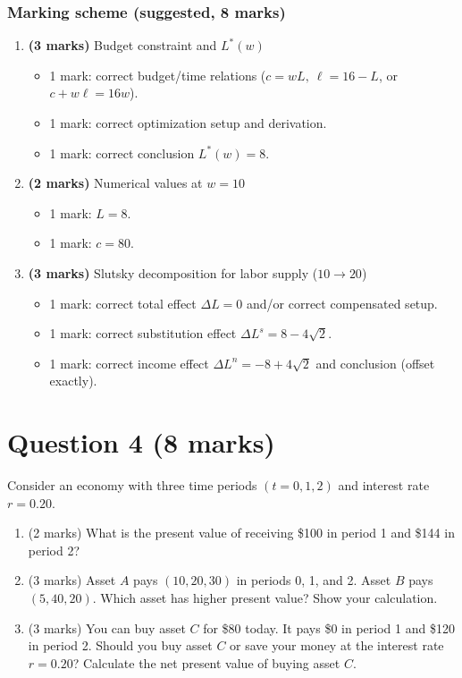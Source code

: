 \documentclass[12pt]{article}
\begin{document}
\newpage
\subsubsection*{Marking scheme (suggested, 8 marks)}

\begin{enumerate}[label=(\alph*)]
\item \textbf{(3 marks)} Budget constraint and \(L^*(w)\)
\begin{itemize}
\item 1 mark: correct budget/time relations (\(c=wL,\ \ell=16-L\), or \(c+w\ell=16w\)).
\item 1 mark: correct optimization setup and derivation.
\item 1 mark: correct conclusion \(\boxed{L^*(w)=8}\).
\end{itemize}

\item \textbf{(2 marks)} Numerical values at \(w=10\)
\begin{itemize}
\item 1 mark: \(\boxed{L=8}\).
\item 1 mark: \(\boxed{c=80}\).
\end{itemize}

\item \textbf{(3 marks)} Slutsky decomposition for labor supply (\(10\to 20\))
\begin{itemize}
\item 1 mark: correct total effect \(\Delta L=0\) and/or correct compensated setup.
\item 1 mark: correct substitution effect \(\boxed{\Delta L^s=8-4\sqrt2}\).
\item 1 mark: correct income effect \(\boxed{\Delta L^n=-8+4\sqrt2}\) and conclusion (offset exactly).
\end{itemize}
\end{enumerate}

\newpage
\section*{Question 4 (8 marks)}

Consider an economy with three time periods $(t = 0, 1, 2)$ and interest rate $r = 0.20$.

\begin{enumerate}[label=(\alph*)]
\item (2 marks) What is the present value of receiving \$100 in period 1 and \$144 in period 2?
\item (3 marks) Asset $A$ pays $(10, 20, 30)$ in periods 0, 1, and 2. Asset $B$ pays $(5, 40, 20)$. Which asset has higher present value? Show your calculation.
\item (3 marks) You can buy asset $C$ for \$80 today. It pays \$0 in period 1 and \$120 in period 2. Should you buy asset $C$ or save your money at the interest rate $r = 0.20$? Calculate the net present value of buying asset $C$.
\end{enumerate}
\bigskip
\end{document}
